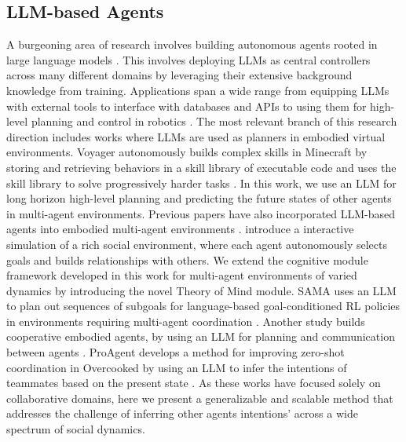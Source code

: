 \documentclass{article} %
\begin{document}
\subsection{LLM-based Agents}

A burgeoning area of research involves building autonomous agents rooted in large language models \cite{wang2024survey,sumers2023cognitive}. This involves deploying LLMs as central controllers across many different domains by leveraging their extensive background knowledge from training. Applications span a wide range from equipping LLMs with external tools to interface with databases and APIs \citep{schick2024toolformer,shen2023hugginggpt,qin2023toolllm} to using them for high-level planning and control in robotics \citep{huang2022inner,brohan2023can,rana2023sayplan, brohan2023rt}. The most relevant branch of this research direction includes works where LLMs are used as planners in embodied virtual environments. Voyager autonomously builds complex skills in Minecraft by storing and retrieving behaviors in a skill library of executable code and uses the skill library to solve progressively harder tasks \citep{wang2023voyager, wang2024survey}. In this work, we use an LLM for long horizon high-level planning and predicting the future states of other agents in multi-agent environments. Previous papers have also incorporated LLM-based agents into embodied multi-agent environments \citep{liu2023improving}. \cite{park2023generative} introduce a interactive simulation of a rich social environment, where each agent autonomously selects goals and builds relationships with others. We extend the cognitive module framework developed in this work for multi-agent environments of varied dynamics by introducing the novel Theory of Mind module. SAMA uses an LLM to plan out sequences of subgoals for language-based goal-conditioned RL policies in environments requiring multi-agent coordination \cite{li2023semantically}. Another study builds cooperative embodied agents, by using an LLM for planning and communication between agents \cite{zhang2023building}. ProAgent develops a method for improving zero-shot coordination in Overcooked by using an LLM to infer the intentions of teammates based on the present state \cite{zhang2023proagent}. As these works have focused solely on collaborative domains, here we present a generalizable and scalable method that addresses the challenge of inferring other agents intentions' across a wide spectrum of social dynamics.
\end{document}
